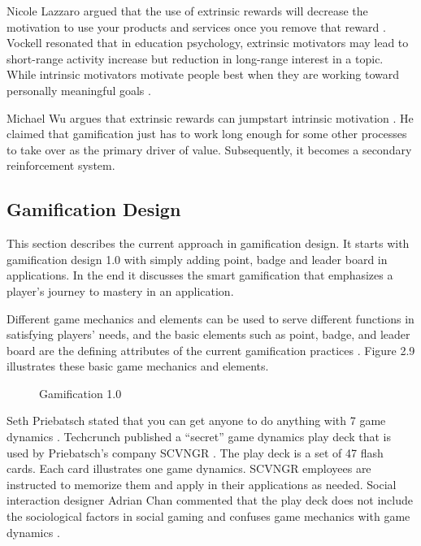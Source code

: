 Nicole Lazzaro argued that the use of extrinsic rewards will decrease the motivation to use your products and services once you remove that reward \cite {Lazzaro2011}. Vockell resonated that in education psychology, extrinsic motivators may lead to short-range activity increase but reduction in long-range interest in a topic. While intrinsic motivators motivate people best when they are working toward personally meaningful goals \cite{vockell2004educational}. 

Michael Wu argues that extrinsic rewards can jumpstart intrinsic motivation  \cite {WuSustainable2011}. He claimed that gamification just has to work long enough for some other processes to take over as the primary driver of value. Subsequently, it becomes a secondary reinforcement system. 

\subsection{Gamification Design}
This section describes the current approach in gamification design. It starts with gamification design 1.0 with simply adding point, badge and leader board in applications. In the end it discusses the smart gamification that emphasizes a player's journey to mastery in an application.

Different game mechanics and elements can be used to serve different functions in satisfying players' needs, and the basic elements such as point, badge, and leader board are the defining attributes of the current gamification practices \cite {Deterding2011dragon}. Figure 2.9 illustrates these basic game mechanics and elements.

\begin{figure}[htbp]
	\centering
		\caption{Gamification 1.0}
		\label{fig:gamification-1-0}
\end{figure}

Seth Priebatsch stated that you can get anyone to do anything with 7 game dynamics \cite {Priebatsch2010ted}. Techcrunch published a ``secret'' game dynamics play deck that is used by Priebatsch's company SCVNGR \cite{Biggs2010}. The play deck is a set of 47 flash cards. Each card illustrates one game dynamics. SCVNGR employees are instructed to memorize them and apply in their applications as needed.  Social interaction designer Adrian Chan commented that the play deck does not include the sociological factors in social gaming and confuses game mechanics with game dynamics \cite {Chan2010}. 

